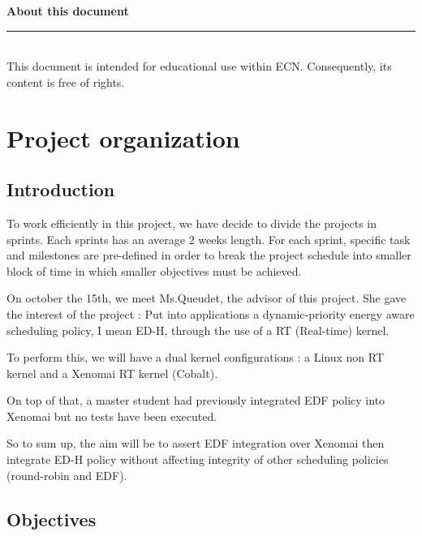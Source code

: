 \documentclass[12pt,hidelinks]{article}
\begin{document}
\newpage

\tableofcontents
\vfill
\small{\noindent \textbf{About this document} \vspace{-3mm}\\
\noindent \rule{3.3cm}{0.5pt} \\
This document is intended for educational use within ECN. Consequently, its content is free of rights.
\newpage
{}
\section{Project organization}
\vspace{4cm}
    



	\subsection{Introduction}
    \newline
    To work efficiently in this project, we have decide to divide the projects in sprints. Each sprints has an average 2 weeks length. For each sprint, specific task and milestones are pre-defined in order to break the project schedule into smaller block of time in which smaller objectives must be achieved.
    
    On october the 15th, we meet Ms.Queudet, the advisor of this project. She gave the interest of the project : Put into applications a dynamic-priority energy aware scheduling policy, I mean ED-H, through the use of a RT (Real-time) kernel.
    
    To perform this, we will have a dual kernel configurations : a Linux non RT kernel and a Xenomai RT kernel (Cobalt).
    
    On top of that, a master student had previously integrated EDF policy into Xenomai but no tests have been executed.
    
    So to sum up, the aim will be to assert EDF integration over Xenomai then integrate ED-H policy without affecting integrity of other scheduling policies (round-robin and EDF). 
    
    \subsection{Objectives}
    
}
\end{document}
